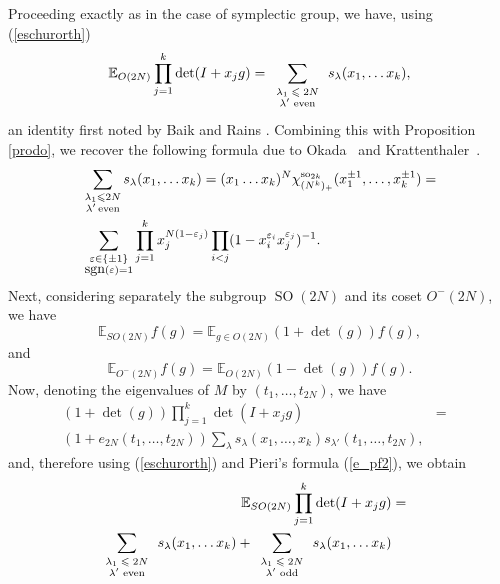 \documentclass[11pt]{amsart}
\newcommand{\tmop}[1]{\ensuremath{\operatorname{#1}}}
\newcommand{\tmscript}[1]{\text{\scriptsize $#1$}}
\newcommand{\so}{{\rm so}}
\newcommand{\sgn}{{\hbox{\rm sgn}}}
\begin{document}
Proceeding exactly as in the case of symplectic group, we have,
using (\ref{eschurorth})
\begin{equation}
  \label{elabc} \mathbb{E}_{O ( 2 N )} \prod_{j = 1}^k \det ( I + x_j g ) =
  \sum_{\tmscript{\begin{array}{c}
    \lambda_1 \leqslant 2 N\\
    \text{$\lambda'$ even}
  \end{array}}} s_{\lambda} ( x_1, \ldots x_k ),
\end{equation}
an identity first noted by Baik and Rains {\cite{BR02}}. Combining
this with Proposition \ref{prodo}, we recover the following
formula due to Okada~{\cite{ok}} and Krattenthaler~{\cite{krat}}.
\begin{equation} \label{oke1} \begin{aligned}
&\sum_{ \substack{\lambda_1 \leqslant 2N \\ \lambda' \,
\text{even}}}s_{\lambda}(x_1, \ldots x_k)=(x_1 \dots
x_k)^{N} \chi_{(N^k)_{+}}^{\so_{2k}}(x_1^{\pm 1},\dots, x_k^{\pm 1})=\\
& \sum_{\substack{\varepsilon\in\{\pm 1\}\\
\sgn(\varepsilon)=1 }}\prod_{j=1}^{k}x_j^{N (1-\varepsilon_j) }
\prod_{i < j}(1-x_i^{\varepsilon_i}x_j^{\varepsilon_j})^{-1}.
\end{aligned}
\end{equation}
Next, considering separately the subgroup $\tmop{SO} ( 2 N )$ and
its coset $O^- ( 2 N )$, we have
\begin{equation}
  \mathbb{E}_{SO ( 2 N )} f ( g ) = \mathbb{E}_{g \in O ( 2 N )} ( 1 + \det (
  g ) ) f ( g ),
\end{equation}
and
\begin{equation}
  \mathbb{E}_{O^- ( 2 N )} f ( g ) = \mathbb{E}_{O ( 2 N )} ( 1 - \det ( g ) )
  f ( g ) .
\end{equation}
Now, denoting the eigenvalues of $M$ by $(t_1, \dots, t_{2N})$, we
have
\begin{eqnarray*}
  ( 1 + \det ( g ) ) \prod_{j = 1}^k \det ( I + x_j g ) & = & \\
  ( 1 + e_{2 N} ( t_1, \ldots, t_{2 N} ) ) \sum_{\lambda} s_{\lambda} ( x_1,
  \ldots, x_k ) s_{\lambda'} ( t_1, \ldots, t_{2 N} ), &  &
\end{eqnarray*}
and, therefore using (\ref{eschurorth}) and Pieri's formula
(\ref{e_pf2}), we obtain
\begin{eqnarray*}
  \mathbb{E}_{SO ( 2 N )} \prod_{j = 1}^k \det ( I + x_j g ) & = & \\
  \sum_{\tmscript{\begin{array}{c}
    \lambda_1 \leqslant 2 N\\
    \text{$\lambda'$ even}
  \end{array}}} s_{\lambda} ( x_1, \ldots x_k ) +
  \sum_{\tmscript{\begin{array}{c}
    \lambda_1 \leqslant 2 N\\
    \text{$\lambda'$ odd}
  \end{array}}} s_{\lambda} ( x_1, \ldots x_k ) &  &
\end{eqnarray*}
\end{document}
